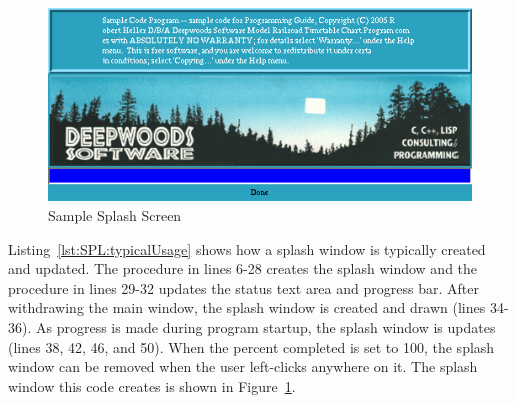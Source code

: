 \begin{figure}[hbpt]
\begin{centering}
\includegraphics{SplashScreen.png}
\caption{Sample Splash Screen}
\label{fig:SPL:SplashScreen}
\end{centering}
\end{figure}
Listing~\ref{lst:SPL:typicalUsage} shows how a splash window is
typically created and updated.  The procedure in lines 6-28 creates the
splash window and the procedure in lines 29-32 updates the status text
area and progress bar.  After withdrawing the main window, the splash
window is created and drawn (lines 34-36).  As progress is made during
program startup, the splash window is updates (lines 38, 42, 46, and
50). When the percent completed is set to 100, the splash window can be
removed when the user left-clicks anywhere on it.  The splash window this
code creates is shown in Figure~\ref{fig:SPL:SplashScreen}.


